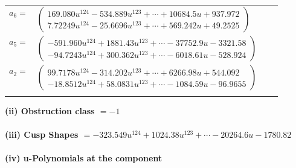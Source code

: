 \documentclass[1p]{elsarticle_modified}
\theoremstyle{definition}
\begin{document}
\begin{tabular}{m{7pt} m{180pt} m{7pt} m{180pt} }
\flushright $a_{6}=$&$\begin{pmatrix}169.080 u^{124}-534.889 u^{123}+\cdots+10684.5 u+937.972\\7.72249 u^{124}-25.6696 u^{123}+\cdots+569.242 u+49.2525\end{pmatrix}$ \\
\flushright $a_{5}=$&$\begin{pmatrix}-591.960 u^{124}+1881.43 u^{123}+\cdots-37752.9 u-3321.58\\-94.7243 u^{124}+300.362 u^{123}+\cdots-6018.61 u-528.924\end{pmatrix}$ \\
\flushright $a_{2}=$&$\begin{pmatrix}99.7178 u^{124}-314.202 u^{123}+\cdots+6266.98 u+544.092\\-18.8512 u^{124}+58.0831 u^{123}+\cdots-1084.59 u-96.9655\end{pmatrix}$\\&\end{tabular}
\flushleft \textbf{(ii) Obstruction class $= -1$}\\~\\
\flushleft \textbf{(iii) Cusp Shapes $= -323.549 u^{124}+1024.38 u^{123}+\cdots-20264.6 u-1780.82$}\\~\\
\newpage\renewcommand{\arraystretch}{1}
\flushleft \textbf{(iv) u-Polynomials at the component}\newline \\
\end{document}
